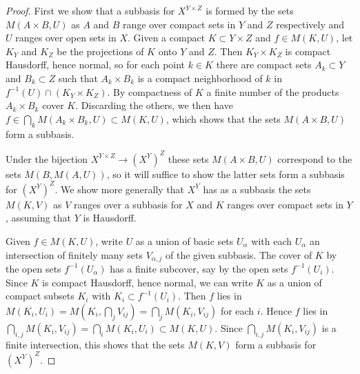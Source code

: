 \documentclass{article}
\theoremstyle{definition}
\begin{document}
\begin{proof}
First we show that a subbasis for $X^{Y \times Z}$ is formed by the sets $M(A \times B, U)$ as $A$ and $B$ range over compact sets in $Y$ and $Z$ respectively and $U$ ranges over open sets in $X$. Given a compact $K \subset Y \times Z$ and $f \in M(K, U)$, let $K_Y$ and $K_Z$ be the projections of $K$ onto $Y$ and $Z$. Then $K_Y \times K_Z$ is compact Hausdorff, hence normal, so for each point $k \in K$ there are compact sets $A_k \subset Y$ and $B_k \subset Z$ such that $A_k \times B_k$ is a compact neighborhood of $k$ in $f^{-1}(U) \cap (K_Y \times K_Z)$. By compactness of $K$ a finite number of the products $A_k \times B_k$ cover $K$. Discarding the others, we then have $f \in \bigcap_k M(A_k \times B_k, U) \subset M(K, U)$, which shows that the sets $M(A \times B, U)$ form a subbasis.

Under the bijection $X^{Y \times Z} \to (X^Y)^Z$ these sets $M(A \times B, U)$ correspond to the sets $M(B, M(A, U))$, so it will suffice to show the latter sets form a subbasis for $(X^Y)^Z$. We show more generally that $X^Y$ has as a subbasis the sets $M(K, V)$ as $V$ ranges over a subbasis for $X$ and $K$ ranges over compact sets in $Y$, assuming that $Y$ is Hausdorff.

Given $f \in M(K, U)$, write $U$ as a union of basic sets $U_\alpha$ with each $U_\alpha$ an intersection of finitely many sets $V_{\alpha,j}$ of the given subbasis. The cover of $K$ by the open sets $f^{-1}(U_\alpha)$ has a finite subcover, say by the open sets $f^{-1}(U_i)$. Since $K$ is compact Hausdorff, hence normal, we can write $K$ as a union of compact subsets $K_i$ with $K_i \subset f^{-1}(U_i)$. Then $f$ lies in $M(K_i, U_i) = M(K_i, \bigcap_j V_{ij}) = \bigcap_j M(K_i, V_{ij})$ for each $i$. Hence $f$ lies in $\bigcap_{i,j} M(K_i, V_{ij}) = \bigcap_i M(K_i, U_i) \subset M(K, U)$. Since $\bigcap_{i,j} M(K_i, V_{ij})$ is a finite intersection, this shows that the sets $M(K, V)$ form a subbasis for $(X^Y)^Z$.
\end{proof}
\end{document}

